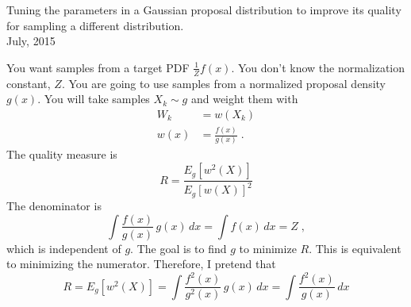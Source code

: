 \documentclass{article}
\begin{document}
{\noindent \large Tuning the parameters in a Gaussian proposal distribution to improve its quality for
sampling a different distribution.\\

\normalsize July, 2015\\}

You want samples from a target PDF $\frac{1}{Z}f(x)$.
You don't know the normalization constant, $Z$.
You are going to use samples from a normalized proposal density $g(x)$.
You will take samples $X_k \sim g$ and weight them with 
\begin{align*}
   W_k &= w(X_k)  \\
   w(x) &= \frac{f(x)}{g(x)} \; .
\end{align*}
The quality measure is
\[
   R = \frac{E_g \!\left[ w^2(X) \right] }{E_g \!\left[ w(X) \right]^2}
\]
The denominator is
\[
    \int \frac{f(x)}{g(x)}\,g(x) \,dx = \int f(x) \,dx= Z \; ,
\]
which is independent of $g$.
The goal is to find $g$ to minimize $R$.
This is equivalent to minimizing the numerator.
Therefore, I pretend that
\[
         R = E_g \!\left[ w^2(X) \right]  = \int \frac{f^2(x)}{g^2(x)}\,g(x) \,dx
            = \int \frac{f^2(x)}{g(x)} \,dx
\]
\end{document}
